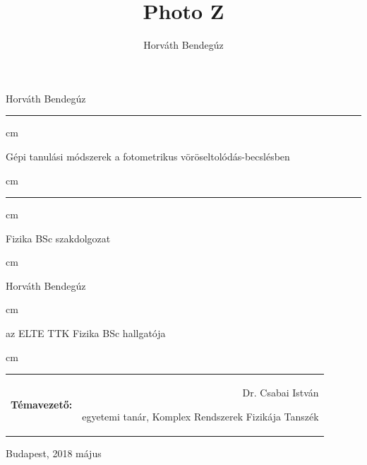 \documentclass[12pt,letterpaper,oneside,openright]{book}
\author{Horváth Bendegúz}
\title{Photo Z}
\date{}
\begin{document}
\begin{titlepage}
\thispagestyle{empty}
\begin{center}
{\color{white}Horváth Bendegúz}
\vspace{150 pt}
\hrule height 1pt
 cm
\begin{LARGE}
Gépi tanulási módszerek a fotometrikus vöröseltolódás-becslésben\end{LARGE}
 cm
\hrule height 1pt

 cm

\begin{small}
Fizika BSc szakdolgozat
\end{small}

 cm

\begin{Large}
Horváth Bendegúz
\end{Large}

 cm

\begin{small}
az ELTE TTK Fizika BSc hallgatója
\end{small}

 cm

\begin{table}[!h]
\begin{center}
\begin{tabular}{lr}

\textbf{Témavezető:}& \begin{large}Dr. Csabai István\end{large} egyetemi tanár, Komplex Rendszerek Fizikája Tanszék
\end{tabular}
\end{center}
\end{table}

Budapest, 2018 május

\end{center}
\end{titlepage}

\newpage

\end{document}
